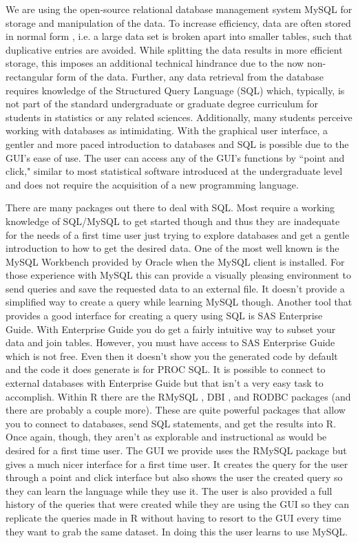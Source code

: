 \documentclass[11pt]{tise_style}
\begin{document}
We are using the open-source relational database management system MySQL \citep{mysql} for %
storage and manipulation of the data. To increase efficiency, data are often stored in normal form \citep{normalform:1983}, i.e. a large data set is broken apart into smaller  tables, such that duplicative entries are avoided. While splitting the data results in  more efficient storage, this imposes an additional technical hindrance due to the now non-rectangular form of the data. Further, any data retrieval from the database requires knowledge of the Structured Query Language (SQL) which, typically, is not part of the standard undergraduate or graduate degree curriculum for students in statistics or any related sciences. Additionally,  many students perceive working with databases as intimidating. With the graphical user interface, a gentler and more paced introduction to databases and SQL is possible due to the GUI's ease of use.  The user can access any of the GUI's functions by ``point and click," similar to most statistical software introduced at the undergraduate level and does not require the acquisition of a new programming language.

There are many packages out there to deal with SQL.  Most require a working knowledge of SQL/MySQL to get started though and thus they are inadequate for the needs of a first time user just trying to explore databases and get a gentle introduction to how to get the desired data.  One of the most well known is the MySQL Workbench provided by Oracle when the MySQL client is installed.  For those experience with MySQL this can provide a visually pleasing environment to send queries and save the requested data to an external file.  It doesn't provide a simplified way to create a query while learning MySQL though.  Another tool that provides a good interface for creating a query using SQL is SAS Enterprise Guide.  With Enterprise Guide you do get a fairly intuitive way to subset your data and join tables.  However, you must have access to SAS Enterprise Guide which is not free.  Even then it doesn't show you the generated code by default and the code it does generate is for PROC SQL.  It is possible to connect to external databases with Enterprise Guide but that isn't a very easy task to accomplish.  Within R there are the RMySQL \citep{rmysql}, DBI \citep{dbi}, and RODBC \citep{rodbc} packages (and there are probably a couple more).  These are quite powerful packages that allow you to connect to databases, send SQL statements, and get the results into R.  Once again, though, they aren't as explorable and instructional as would be desired for a first time user.  The GUI we provide uses the RMySQL package but gives a much nicer interface for a first time user.  It creates the query for the user through a point and click interface but also shows the user the created query so they can learn the language while they use it.  The user is also provided a full history of the queries that were created while they are using the GUI so they can replicate the queries made in R without having to resort to the GUI every time they want to grab the same dataset.  In doing this the user learns to use MySQL.
\end{document}
